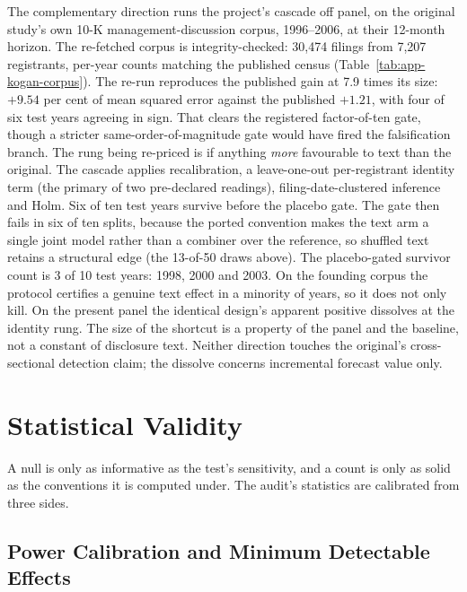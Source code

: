 The complementary direction runs the project's cascade off panel, on the original study's own 10-K management-discussion corpus, 1996--2006, at their 12-month horizon. The re-fetched corpus is integrity-checked: 30{,}474 filings from 7{,}207 registrants, per-year counts matching the published census (Table~\ref{tab:app-kogan-corpus}). %
The re-run reproduces the published gain at 7.9 times its size: $+9.54$ per cent of mean squared error against the published $+1.21$, with four of six test years agreeing in sign. That clears the registered factor-of-ten gate, though a stricter same-order-of-magnitude gate would have fired the falsification branch. The rung being re-priced is if anything \emph{more} favourable to text than the original. %
The cascade applies recalibration, a leave-one-out per-registrant identity term (the primary of two pre-declared readings), filing-date-clustered inference and Holm. Six of ten test years survive before the placebo gate. The gate then fails in six of ten splits, because the ported convention makes the text arm a single joint model rather than a combiner over the reference, so shuffled text retains a structural edge (the 13-of-50 draws above). The placebo-gated survivor count is 3 of 10 test years: 1998, 2000 and 2003. %
On the founding corpus the protocol certifies a genuine text effect in a minority of years, so it does not only kill. On the present panel the identical design's apparent positive dissolves at the identity rung. The size of the shortcut is a property of the panel and the baseline, not a constant of disclosure text. Neither direction touches the original's cross-sectional detection claim; the dissolve concerns incremental forecast value only.

\section{Statistical Validity}
\label{sec:val-statistical}

A null is only as informative as the test's sensitivity, and a count is only as solid as the conventions it is computed under. The audit's statistics are calibrated from three sides.

\subsection{Power Calibration and Minimum Detectable Effects}
\label{sec:val-power}

